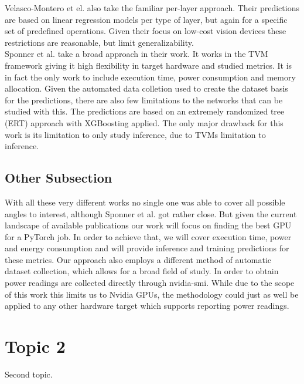 Velasco-Montero et el. also take the familiar per-layer approach. Their predictions are based on linear
regression models per type of layer, but again for a specific set of predefined operations. Given their 
focus on low-cost vision devices these restrictions are reasonable, but limit generalizability. \\
Sponner et al. take a broad approach in their work. It works in the TVM framework giving it high flexibility
in target hardware and studied metrics. It is in fact the only work to include execution time, power
consumption and memory allocation. Given the automated data colletion used to create the dataset basis
for the predictions, there are also few limitations to the networks that can be studied with this. 
The predictions are based on an extremely randomized tree (ERT) approach with XGBoosting applied. The 
only major drawback for this work is its limitation to only study inference, due to TVMs limitation to inference. \\

\subsection{Other Subsection}
With all these very different works no single one was able to cover all possible angles to interest,
although Sponner et al. got rather close. But given the current landscape of available publications
our work will focus on finding the best GPU for a PyTorch job. In order to achieve that, we will cover
execution time, power and energy consumption and will provide inference and training predictions for these
metrics. Our approach also employs a different method of automatic dataset collection, which allows
for a broad field of study. In order to obtain power readings are collected directly through nvidia-smi.
While due to the scope of this work this limits us to Nvidia GPUs, the methodology could just as well be 
applied to any other hardware target which supports reporting power readings. \\

\section{Topic 2}
Second topic.
